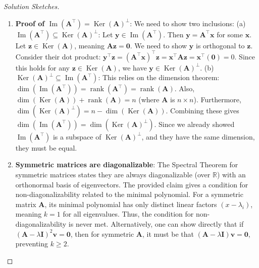 \documentclass[11pt, a4paper]{article}
\DeclareMathOperator{\rank}{\mathrm{rank}}       %
\DeclareMathOperator{\Image}{\mathrm{Im}}        %
\DeclareMathOperator{\Ker}{\mathrm{Ker}}         %
\theoremstyle{definition}
\theoremstyle{remark}
\newcommand{\RR}{\mathbb{R}}             %
\newcommand{\mat}[1]{\mathbf{#1}}       %
\newcommand{\vect}[1]{\bm{#1}}          %
\newcommand{\transpose}{^{\top}}        %
\begin{document}
\begin{proof}[Solution Sketches]
\begin{enumerate}
    \item \textbf{Proof of $\Image(\mat{A}\transpose) = \Ker(\mat{A})^{\perp}$}:
    We need to show two inclusions:
    (a) $\Image(\mat{A}\transpose) \subseteq \Ker(\mat{A})^{\perp}$: Let $\vect{y} \in \Image(\mat{A}\transpose)$. Then $\vect{y} = \mat{A}\transpose \vect{x}$ for some $\vect{x}$. Let $\vect{z} \in \Ker(\mat{A})$, meaning $\mat{A}\vect{z} = \vect{0}$. We need to show $\vect{y}$ is orthogonal to $\vect{z}$. Consider their dot product: $\vect{y}\transpose \vect{z} = (\mat{A}\transpose \vect{x})\transpose \vect{z} = \vect{x}\transpose \mat{A} \vect{z} = \vect{x}\transpose (\vect{0}) = 0$. Since this holds for any $\vect{z} \in \Ker(\mat{A})$, we have $\vect{y} \in \Ker(\mat{A})^{\perp}$.
    (b) $\Ker(\mat{A})^{\perp} \subseteq \Image(\mat{A}\transpose)$: This relies on the dimension theorem: $\dim(\Image(\mat{A}\transpose)) = \rank(\mat{A}\transpose) = \rank(\mat{A})$. Also, $\dim(\Ker(\mat{A})) + \rank(\mat{A}) = n$ (where $\mat{A}$ is $n \times n$). Furthermore, $\dim(\Ker(\mat{A})^{\perp}) = n - \dim(\Ker(\mat{A}))$. Combining these gives $\dim(\Image(\mat{A}\transpose)) = \dim(\Ker(\mat{A})^{\perp})$. Since we already showed $\Image(\mat{A}\transpose)$ is a subspace of $\Ker(\mat{A})^{\perp}$, and they have the same dimension, they must be equal.

    \item \textbf{Symmetric matrices are diagonalizable}: The Spectral Theorem for symmetric matrices states they are always diagonalizable (over $\RR$) with an orthonormal basis of eigenvectors. The provided claim gives a condition for non-diagonalizability related to the minimal polynomial. For a symmetric matrix $\mat{A}$, its minimal polynomial has only distinct linear factors $(x-\lambda_i)$, meaning $k=1$ for all eigenvalues. Thus, the condition for non-diagonalizability is never met. Alternatively, one can show directly that if $(\mat{A}-\lambda \mat{I})^2 \vect{v} = \vect{0}$, then for symmetric $\mat{A}$, it must be that $(\mat{A}-\lambda \mat{I}) \vect{v} = \vect{0}$, preventing $k \ge 2$.


\end{enumerate}
\end{proof}
\end{document}
